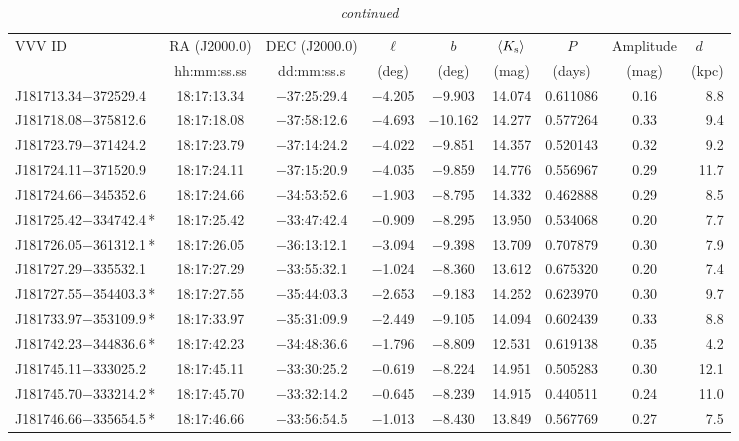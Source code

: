 \begin{table*}
\centering
\caption[]{{\it continued}}
\begin{tabular}{lcccccccr}
\hline \hline
VVV ID & RA (J2000.0)  & DEC (J2000.0) & $\ell$ & $b$ &  $\langle K_{\rm s} \rangle$ & $P$ & Amplitude & $d$~~~ \\
     & hh:mm:ss.ss    & dd:mm:ss.s   &  (deg) & (deg) &   (mag)       & (days) & (mag) & (kpc)   \\
\hline
J181713.34$-$372529.4 & 18:17:13.34 & $-$37:25:29.4 & $-$4.205 & $-$9.903 & 14.074 & 0.611086 & 0.16 & 8.8 \\
J181718.08$-$375812.6 & 18:17:18.08 & $-$37:58:12.6 & $-$4.693 & $-$10.162 & 14.277 & 0.577264 & 0.33 & 9.4 \\
J181723.79$-$371424.2 & 18:17:23.79 & $-$37:14:24.2 & $-$4.022 & $-$9.851 & 14.357 & 0.520143 & 0.32 & 9.2 \\
J181724.11$-$371520.9 & 18:17:24.11 & $-$37:15:20.9 & $-$4.035 & $-$9.859 & 14.776 & 0.556967 & 0.29 & 11.7 \\
J181724.66$-$345352.6 & 18:17:24.66 & $-$34:53:52.6 & $-$1.903 & $-$8.795 & 14.332 & 0.462888 & 0.29 & 8.5 \\
J181725.42$-$334742.4\,* & 18:17:25.42 & $-$33:47:42.4 & $-$0.909 & $-$8.295 & 13.950 & 0.534068 & 0.20 & 7.7 \\
J181726.05$-$361312.1\,* & 18:17:26.05 & $-$36:13:12.1 & $-$3.094 & $-$9.398 & 13.709 & 0.707879 & 0.30 & 7.9 \\
J181727.29$-$335532.1 & 18:17:27.29 & $-$33:55:32.1 & $-$1.024 & $-$8.360 & 13.612 & 0.675320 & 0.20 & 7.4 \\
J181727.55$-$354403.3\,* & 18:17:27.55 & $-$35:44:03.3 & $-$2.653 & $-$9.183 & 14.252 & 0.623970 & 0.30 & 9.7 \\
J181733.97$-$353109.9\,* & 18:17:33.97 & $-$35:31:09.9 & $-$2.449 & $-$9.105 & 14.094 & 0.602439 & 0.33 & 8.8 \\
J181742.23$-$344836.6\,* & 18:17:42.23 & $-$34:48:36.6 & $-$1.796 & $-$8.809 & 12.531 & 0.619138 & 0.35 & 4.2 \\
J181745.11$-$333025.2 & 18:17:45.11 & $-$33:30:25.2 & $-$0.619 & $-$8.224 & 14.951 & 0.505283 & 0.30 & 12.1 \\
J181745.70$-$333214.2\,* & 18:17:45.70 & $-$33:32:14.2 & $-$0.645 & $-$8.239 & 14.915 & 0.440511 & 0.24 & 11.0 \\
J181746.66$-$335654.5\,* & 18:17:46.66 & $-$33:56:54.5 & $-$1.013 & $-$8.430 & 13.849 & 0.567769 & 0.27 & 7.5 \\

\end{tabular}
\end{table*}
